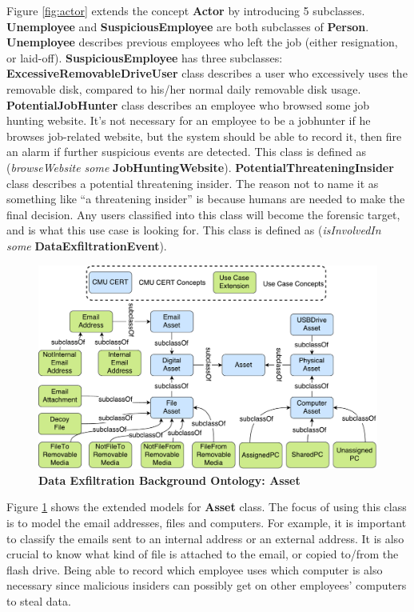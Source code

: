 Figure \ref{fig:actor} extends the concept \textbf{Actor} by introducing 5 subclasses. 
\textbf{Unemployee} and \textbf{SuspiciousEmployee} are both subclasses of \textbf{Person}.
\textbf{Unemployee} describes previous employees who left the job (either resignation, or laid-off). 
\textbf{SuspiciousEmployee} has three subclasses:
\textbf{ExcessiveRemovableDriveUser} class describes a user who excessively uses the removable disk, compared to his/her normal daily removable disk usage. 
\textbf{PotentialJobHunter} class describes an employee who browsed some job hunting website. 
It's not necessary for an employee to be a jobhunter if he browses job-related website, but the system should be able to record it, then fire an alarm if further suspicious events are detected. 
This class is defined as (\textit{browseWebsite some} \textbf{JobHuntingWebsite}). 
\textbf{PotentialThreateningInsider} class describes a potential threatening insider.
The reason not to name it as something like ``a threatening insider'' is because humans are needed to make the final decision. 
Any users classified into this class will become the forensic target, and is what this use case is looking for. 
This class is defined as (\textit{isInvolvedIn some} \textbf{DataExfiltrationEvent}). 

\begin{figure}[!htbp]
	\centering
    \includegraphics[width=5in]{img/5-dxoasset.pdf}
    \caption{\textbf{Data Exfiltration Background Ontology: Asset}}
    \label{fig:asset}
\end{figure}

Figure \ref{fig:asset} shows the extended models for \textbf{Asset} class.
The focus of using this class is to model the email addresses, files and computers. 
For example, it is important to classify the emails sent to an internal address or an external address. 
It is also crucial to know what kind of file is attached to the email, or copied to/from the flash drive. 
Being able to record which employee uses which computer is also necessary since malicious insiders can possibly get on other employees' computers to steal data. 

